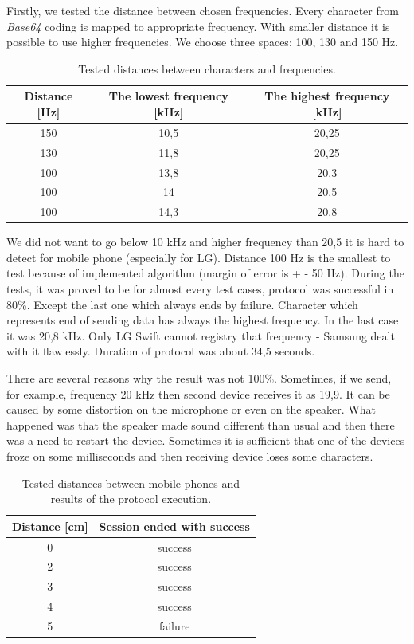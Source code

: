 \documentclass[11pt,titlepage]{article}
\theoremstyle{plain}
\begin{document}
Firstly, we tested  the distance between chosen frequencies. Every character from \textit{Base64} coding is mapped to appropriate frequency. With smaller distance it is possible to use higher frequencies. We choose three spaces: 100, 130 and 150 Hz.
\begin{table}[H]
	\centering
	\begin{tabular}{| c | c | c |}
		\hline
		Distance [Hz] & The lowest frequency [kHz] & The highest frequency [kHz]\\
		\hline
		150 & 10,5 & 20,25 \\
		\hline
		130 & 11,8 & 20,25 \\
		\hline
		100 & 13,8 & 20,3 \\
		\hline
		100 & 14 & 20,5 \\
		\hline
		100 & 14,3 & 20,8 \\
		\hline
	\end{tabular}
	\caption{Tested distances between characters and frequencies.}
\end{table}

We did not want to go below 10 kHz and higher frequency than 20,5 it is hard to detect for mobile phone (especially for LG). Distance 100 Hz is the smallest to test because of implemented algorithm (margin of error is + - 50 Hz). During the tests, it was proved to be for almost every test cases, protocol was successful in 80\%. Except the last one which always ends by failure. Character which represents end of sending data has always the highest frequency. In the last case it was 20,8 kHz. Only LG Swift cannot registry that frequency - Samsung dealt with it flawlessly. Duration of protocol was about 34,5 seconds.

\vspace{5mm}

There are several reasons why the result was not 100\%. Sometimes, if we send, for example, frequency 20 kHz then second device receives it as 19,9. It can be caused by some distortion on the microphone or even on the speaker. What happened was that the speaker made sound different than usual and then there was a need to restart the device. Sometimes it is sufficient that one of the devices froze on some milliseconds and then receiving device loses some characters. 

\vspace{5mm}

\begin{table}[H]
	\centering
	\begin{tabular}{| c | c |}
		\hline
		Distance [cm] & Session ended with success \\
		\hline
		0 & success \\
		\hline
		2 & success \\
		\hline
		3 & success \\
		\hline
		4 & success \\
		\hline
		5 & failure \\
		\hline
	\end{tabular}
	\caption{Tested distances between mobile phones and results of the protocol execution.}
\end{table}
\end{document}
